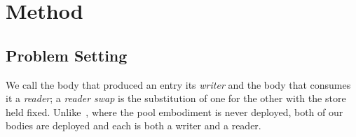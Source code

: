 \documentclass[letterpaper, 10 pt, conference]{ieeeconf}
\begin{document}

\section{Method}
\label{sec:method}

\subsection{Problem Setting}
\label{sec:method:setting}

We call the body that produced an entry its \emph{writer} and the body that
consumes it a \emph{reader}; a \emph{reader swap} is the substitution of one for
the other with the store held fixed. Unlike~\cite{recap}, where the pool
embodiment is never deployed, both of our bodies are deployed and each is both a
writer and a reader.
\end{document}
